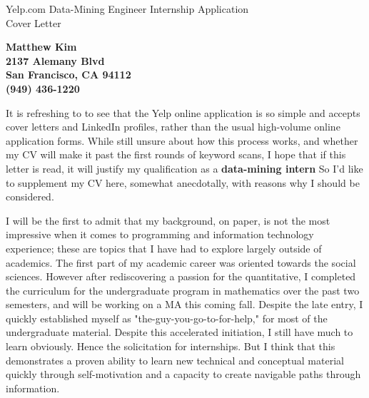 \documentclass[11pt]{letter} %
\begin{document}
\signature{Matthew Kim}                  %
\longindentation=0pt                       %
\let\raggedleft\raggedright                %
 
\begin{letter}{Yelp.com Data-Mining Engineer Internship Application\\
 Cover Letter} 

\begin{center}
\bf Matthew Kim\\
2137 Alemany Blvd\\ San Francisco, CA 94112\\ (949) 436-1220
\end{center} 
\vfill %

\opening{} 

It is refreshing to to see that the Yelp online application is so simple and accepts cover letters and LinkedIn profiles, rather than the usual high-volume online application forms.  While still unsure about how this process works, and whether my CV will make it past the first rounds of keyword scans, I hope that if this letter is read, it will justify my qualification as a {\bf data-mining intern}
  So I'd like to supplement my CV here, somewhat anecdotally, with reasons why I should be considered. 
  
I will be the first to admit that my background, on paper, is not the most impressive when it comes to programming and information technology experience; these are topics that I have had to explore largely outside of academics.  The first part of my academic career was oriented towards the social sciences. However after rediscovering a passion for the quantitative, I completed the curriculum for the undergraduate program in mathematics over the past two semesters, and will be working on a MA this coming fall. Despite the late entry, I quickly established myself as "the-guy-you-go-to-for-help," for most of the undergraduate material.  Despite this accelerated initiation, I still have much to learn obviously.   Hence the solicitation for internships.  But I think that this demonstrates a proven ability to learn new technical and conceptual material quickly through self-motivation and a capacity to create navigable paths through information.  


\end{letter}
\end{document}
